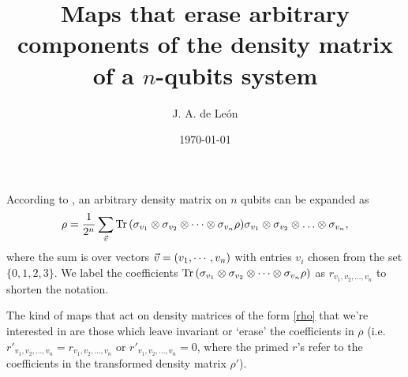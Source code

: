 \documentclass[11pt]{article}
\begin{document}
\title{Maps that erase arbitrary components of the density matrix of a $n$-qubits system} %
\author{J. A. de Le\'on} 


\date{\today}  

\maketitle


According to \cite{nielsen_chuang_2011}, an arbitrary density matrix on $n$
qubits can be expanded as
\begin{align}
	\rho = \frac{1}{2^n}\sum _{\vec{v}} \Tr 
                  \qty( \sigma _{v_1} \otimes \sigma_{v_2} \otimes 
               \cdots \otimes \sigma_{v_n} \rho) \sigma _{v_1} \otimes 
             \sigma_{v_2} \otimes \ldots \otimes \sigma_{v_n},
	\label{rho}
\end{align}
where the sum is over vectors $\vec{v}=\qty(v_1,\cdots, v_n)$ with entries
$v_i$ chosen from the set $\{0,1,2,3\}$. We label the coefficients $\Tr \qty(
\sigma _{v_1} \otimes \sigma_{v_2} \otimes \cdots \otimes \sigma_{v_n}
\rho )$ as $r_{v_1, v_2,\ldots, v_n}$ to shorten the notation. 

The kind of maps that act on density matrices of the form \eqref{rho} that
we're interested in are those which leave invariant or `erase' the coefficients
in $\rho$ (i.e. $r'_{v_1, v_2,\ldots, v_n}=r_{v_1, v_2,\ldots, v_n}$ or
$r'_{v_1, v_2,\ldots, v_n}=0$, where the primed $r$'s refer to the coefficients
in the transformed density matrix $\rho '$). 
\end{document}
